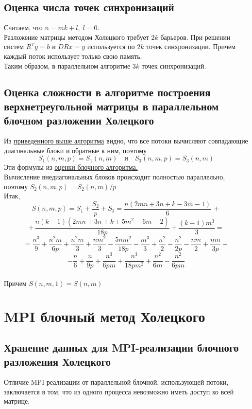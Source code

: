 \documentclass[a4paper,12pt]{article}
\begin{document}
\subsection{Оценка числа точек синхронизаций}
    Считаем, что $n = mk + l,\; l = 0$.\\
    
    Разложение матрицы методом Холецкого требует $2k$ барьеров.
    При решении систем $R^T y = b$ и $DRx = y$ используется по $2k$ точек синхронизации.
    Причем каждый поток использует только свою память.\\
    
    Таким образом, в параллельном алгоритме $3k$ точек синхронизаций.
    

\newpage
\subsection{Оценка сложности в алгоритме построения верхнетреугольной матрицы
в параллельном блочном разложении Холецкого}
    Из \hyperlink{paral_alg}{приведенного выше алгоритма} видно, что все потоки 
    вычисляют совпадающие диагональные блоки и обратные к ним, поэтому 
    $$
        S_1(n,m,p) = S_1(n,m) \quad \text{и} \quad S_3(n,m,p) = S_3(n,m)
    $$
    Эти формулы из \hyperlink{block_border}{оценки блочного алгоритма.} \\
    
    Вычисление внедиагональных блоков происходит полностью параллельно, поэтому 
    $ S_2(n,m,p) = S_2(n,m)/p $ \\

    Итак, 
    $$
        S(n,m,p) = S_1 + \frac{S_2}{p} + S_3 = 
        \frac{n(2mn + 3n + k - 3m -1)}6 \,+ $$$$ +\,
        \frac{n(k-1)(2mn+3n+k+5m^2-6m-2)}{18p} +
        \frac{(k-1)m^3}3 = $$$$ =
        \frac{n^3}9 + \frac{n^2m}{6p} + \frac{n^2m}{3} +
        \frac{nm^2}3 - \frac{5nm^2}{18p} - \frac{m^3}3 +
        \frac{n^2}2 - \frac{n^2}{2p} - \frac{nm}2 + \frac{nm}{3p} - $$$$ -
        \frac{n}6 + \frac{n}{9p} + \frac{n^3}{6pm} + \frac{n^3}{18pm^2} +
        \frac{n^2}{6m} - \frac{n^2}{6pm}
    $$ \\
    
    Причем $S(n,m,1) = S(n,m)$




\newpage
\section{MPI блочный метод Холецкого}
\subsection{Хранение данных для MPI-реализации блочного разложения Холецкого}
    Отличие MPI-реализации от параллельной блочной, использующей потоки,
    заключается в том, что из одного процесса невозможно иметь доступ
    ко всей матрице. \\
    
\end{document}
